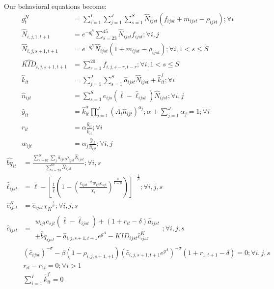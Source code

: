 \documentclass[letterpaper,12pt]{article}
\theoremstyle{definition}
\numberwithin{equation}{section}
\begin{document}
\begin{spacing}{1.5}
	Our behavioral equations become:
	\begin{align}
		g^N_t & = \sum_{i=1}^I \sum_{j=1}^J \sum_{s=1}^S \hat N_{ijst} (f_{ijst}+m_{ijst}-\rho_{ijst}) ; \forall i \label{eq_5demo1}\\
		\hat N_{i,j,1,t+1} & = e^{-g^N_t}\sum_{s=23}^{45} \hat N_{ijst} f_{ijst} ; \forall i,j \\
		\hat N_{i,j,s+1,t+1} & = e^{-g^N_t}\hat N_{ijst} (1+m_{ijst}-\rho_{ijst}); \forall i, 1<s\le S \\
		\hat{KID}_{i,j,s+1,t+1} & = \sum_{r=1}^{20} f_{i,j,s-r,t-r}; \forall i, 1<s\le S \label{eq_5demo4}\\
		\hat k_{it} & = \sum_{j=1}^J \sum_{s=1}^S \hat a_{ijst} \hat N_{ijst} + \hat k_{it}^f; \forall i \label{eq_5ksum}\\
		\hat n_{ijt} & = \sum_{s=1}^S e_{ijs} (\bar \ell - \hat \ell_{ijst} ) \hat N_{ijst}; \forall i,j \label{eq_5nsum}\\
		\hat y_{it} & = \hat k_{it}^\alpha \prod_{j=1}^J \left( A_{i} \hat n_{ijt} \right)^{\alpha_j}; \alpha + \sum_{j=1}^J \alpha_j = 1 ; \forall i \label{eq_5yfunc} \\
		r_{it} & = \alpha \frac{\hat y_{it}}{\hat k_{it}}; \forall i \label{eq_5rfunc}\\
		w_{ijt} & = \alpha_j \frac{\hat y_{it}}{\hat n_{ijt}}; \forall i,j \label{eq_5wfunc}
	\end{align}
	\begin{align}
		\hat {bq}_{it} & = \frac{\sum_{s=67}^S \sum_j \hat a_{ijst} \rho_{ijst} \hat N_{ijst}}{\sum_{s=23}^{67} \hat N_{ijst}} ; \forall i,s \label{eq_5bqfunc}\\
    	\hat \ell_{ijst} & = \bar \ell - \left[\frac{1}{\bar \ell} \left( 1-\left(\frac{{c_{ijst}}^{-\sigma} w_{ijt} e_{sjt}}{\chi_\ell} \right)^{\frac{\mu}{1-\mu}} \right) \right]^{-\frac{1}{\mu}}; \forall i,j,s \label{eq_5elldef} \\
		\hat c^K_{ijst} & = \hat c_{ijst} {\chi_K}^{\frac{1}{\sigma}}; \forall i,j,s \label{eq_5cKdef} \\
		\hat c_{ijst} & = \begin{matrix} w_{ijt} e_{sjt} (\bar \ell - \hat \ell_{ijst}) + (1+r_{it}-\delta)\hat a_{ijst} \\ +\hat bq_{ijst} - \hat a_{i,j,s+1,t+1} e^{g^A} - {KID}_{ijst} \hat c^K_{ijst}\end{matrix}; \forall i,j,s \label{eq_5BC} \\
		& \left({\hat c_{ijst}}\right)^{-\sigma} - \beta (1-\rho_{i,j,s+1,+1}) \left(\hat c_{i,j,s+1,t+1} e^{g^A}\right)^{-\sigma}(1+r_{1,t+1}-\delta) = 0; \forall i,j,s \label{eq_5HH5func}\\
		& r_{it} - r_{1t} = 0; \forall i>1 \label{eq_5requal}\\
		& \sum_{i=1}^I \hat k^f_{it} = 0 \label{eq_5kfsum}
	\end{align}



\end{spacing}
\end{document}
